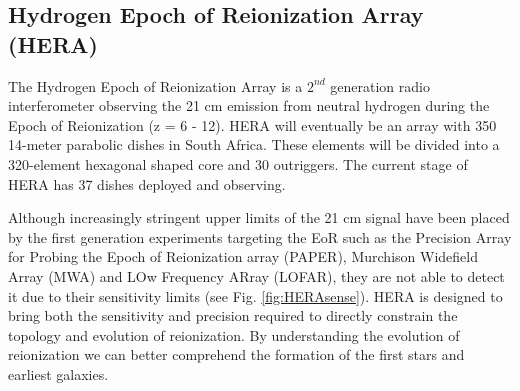 \documentclass[a0,landscape]{a0poster}
\begin{document}
\begin{multicols}{4}

\section*{Hydrogen Epoch of Reionization Array (HERA)}

The Hydrogen Epoch of Reionization Array is a $2^{nd}$ generation radio interferometer observing the 21 cm emission from neutral hydrogen during the Epoch of Reionization (z = 6 - 12). HERA will eventually be an array with 350 14-meter parabolic dishes in South Africa. These elements will be divided into a 320-element hexagonal shaped core and 30 outriggers. The current stage of HERA has 37 dishes deployed and observing. 

Although increasingly stringent upper limits of the 21 cm signal have been placed by the first generation experiments targeting the EoR such as the Precision Array for Probing the Epoch of Reionization array (PAPER), Murchison Widefield Array (MWA) and LOw Frequency ARray (LOFAR), they are not able to detect it due to their sensitivity limits (see Fig. \ref{fig:HERAsense}). HERA is designed to bring both the sensitivity and precision required to directly constrain the topology and evolution of reionization. By understanding the evolution of reionization we can better comprehend the formation of the first stars and earliest galaxies.\\


\end{multicols}
\end{document}
